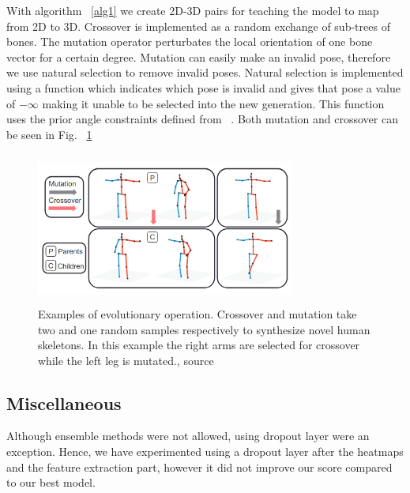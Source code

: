 With algorithm ~\ref{alg1} we create 2D-3D pairs for teaching the model to map from 2D to 3D.
Crossover is implemented as a random exchange of sub-trees of bones.
The mutation operator perturbates the local orientation of one bone vector for a certain degree.
Mutation can easily make an invalid pose, therefore we use natural selection to remove invalid poses.
Natural selection is implemented using a function which indicates which pose is invalid
and gives that pose a value of $-\infty$ making it unable to be selected into the new generation.
This function uses the prior angle constraints defined from ~\cite{Akhter_2015_CVPR}.
Both mutation and crossover can be seen in Fig. ~\ref{evolved}

\begin{figure}
    \includegraphics[height=5cm, width=8.5cm]{evolution.png}
    \caption{Examples of evolutionary operation. Crossover and mutation take two and one random samples respectively to synthesize novel human skeletons. In this example the right arms are selected for crossover while the left leg is mutated., source ~\cite{Li_2020_CVPR}}
    \label{evolved}
\end{figure}

\subsection{Miscellaneous}


Although ensemble methods were not allowed, using dropout layer were an exception.
Hence, we have experimented using a dropout layer after the heatmaps and the feature extraction part,
however it did not improve our score compared to our best model.

